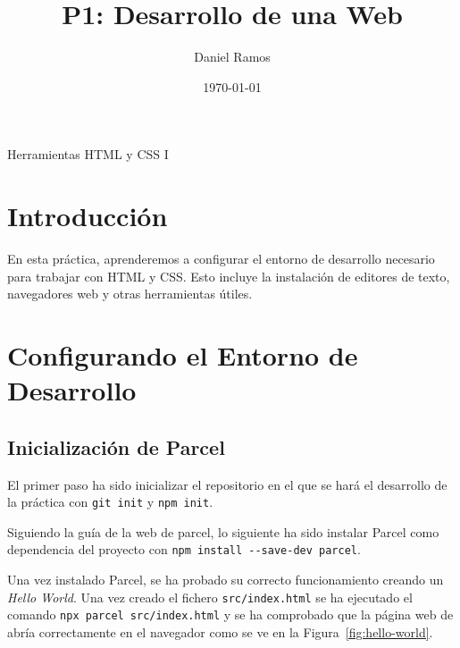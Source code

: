 \documentclass{article}
\title{P1: Desarrollo de una Web}
\author{Daniel Ramos}
\date{\today}
\begin{document}
\maketitle

\begin{center}
    \large Herramientas HTML y CSS I
\end{center}

\newpage

\tableofcontents

\newpage

\section*{Introducción}
En esta práctica, aprenderemos a configurar el entorno de desarrollo necesario para trabajar con HTML y CSS. Esto incluye la instalación de editores de texto, navegadores web y otras herramientas útiles.

\newpage

\section{Configurando el Entorno de Desarrollo}\label{sec:configurando-el-entorno-de-desarrollo}

\subsection{Inicialización de Parcel}\label{subsec:inicializacion-de-parcel}

El primer paso ha sido inicializar el repositorio en el que se hará el desarrollo de la práctica con \lstinline|git init| y \lstinline|npm init|.

Siguiendo la guía de la web de parcel, lo siguiente ha sido instalar Parcel como dependencia del proyecto con \lstinline|npm install --save-dev parcel|.

Una vez instalado Parcel, se ha probado su correcto funcionamiento creando un \textit{Hello World}. Una vez creado el fichero \lstinline|src/index.html| se ha ejecutado el comando \lstinline|npx parcel src/index.html| y se ha comprobado que la página web de abría correctamente en el navegador como se ve en la Figura~\ref{fig:hello-world}.
\end{document}

